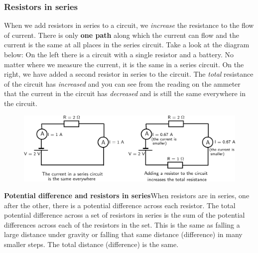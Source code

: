             \subsubsection{ Resistors in series}
            \nopagebreak
          \label{m38776*id67450}When we add resistors in series to a circuit, we \textsl{increase} the resistance to the flow of current. There is only \textbf{one path} along which the current can flow and the current is the same at all places in the series circuit. Take a look at the diagram below: On the left there is a circuit with a single resistor and a battery. No matter where we measure the current, it is the same in a series circuit. On the right, we have added a second resistor in series to the circuit. The \textsl{total} resistance of the circuit has \textsl{increased} and you can see from the reading on the ammeter that the current in the circuit has \textsl{decreased} and is still the same everywhere in the circuit.\par 
          \label{m38776*id67481}
    \setcounter{subfigure}{0}
	\begin{figure}[H] %
    \begin{center}
    \label{m38776*id67485!!!underscore!!!media}\label{m38776*id67485!!!underscore!!!printimage}\includegraphics{col11305.imgs/m38776_PG10C9_032.png} %
      \vspace{2pt}
    \vspace{.1in}
    \end{center}
 \end{figure}       
          \par 
\label{m38776*id64070}\noindent{}\textbf{Potential difference and resistors in series}When resistors are in series, one after the other, there is a potential difference across each resistor. The total potential difference across a set of resistors in series is the sum of the potential differences across each of the resistors in the set. This is the same as falling a large distance under gravity or falling that same distance (difference) in many smaller steps. The total distance (difference) is the same.\par 
